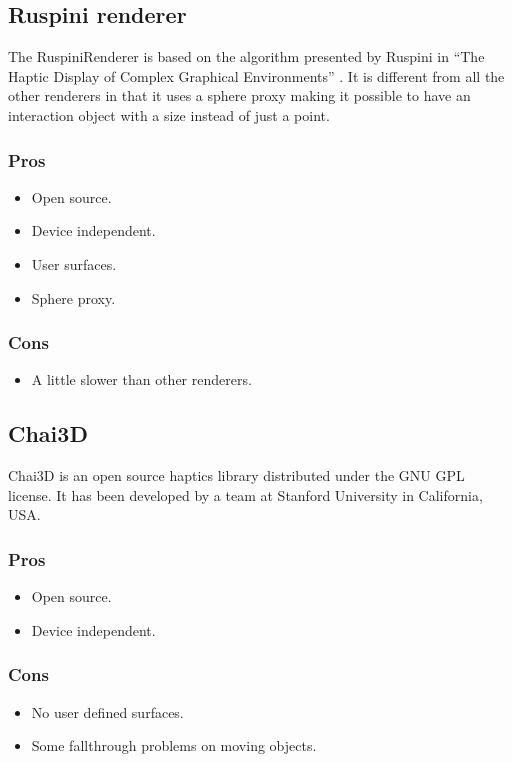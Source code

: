 \subsection{Ruspini renderer}
The RuspiniRenderer is based on the algorithm presented by Ruspini in ``The Haptic Display of Complex Graphical Environments'' \cite{ruspini}. It is different from all the other renderers in that it uses a sphere proxy making it possible to have an interaction object with a size instead of just a point.  

\begin{minipage}[t]{3in}
\subsubsection{Pros}
\begin{itemize}
\item Open source.
\item Device independent.
\item User surfaces.
\item Sphere proxy.
\end{itemize}
\end{minipage}
\begin{minipage}[t]{3in}
\subsubsection{Cons}
\begin{itemize}
\item A little slower than other renderers.
\end{itemize}
\end{minipage}

\subsection{Chai3D}
Chai3D \cite{chai3d} is an open source haptics library distributed under the GNU GPL license. It has been developed by a team at Stanford University in California, USA. 

\begin{minipage}[t]{3in}
\subsubsection{Pros}
\begin{itemize}
\item Open source.
\item Device independent.
\end{itemize}
\end{minipage}
\begin{minipage}[t]{3in}
\subsubsection{Cons}
\begin{itemize}
\item No user defined surfaces.
\item Some fallthrough problems on moving objects.
\end{itemize}
\end{minipage}

